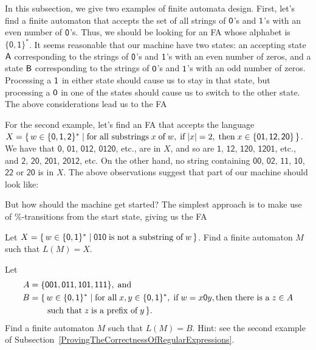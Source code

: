 %
In this subsection, we give two examples of finite automata
design.  First, let's find a finite automaton that accepts the set
of all strings of $\mathsf{0}$'s and $\mathsf{1}$'s with an even number of
$\mathsf{0}$'s.  Thus, we should be looking for an FA whose alphabet is
$\{\mathsf{0,1}\}^*$.  It seems reasonable that our machine have two
states: an accepting state $\mathsf{A}$ corresponding to the strings of
$\mathsf{0}$'s and $\mathsf{1}$'s with an even number of zeros, and a state
$\mathsf{B}$ corresponding to the strings of $\mathsf{0}$'s and $\mathsf{1}$'s with
an odd number of zeros.  Processing a $\mathsf{1}$ in either state should
cause us to stay in that state, but processing a $\mathsf{0}$ in one of
the states should cause us to switch to the other state.  The above
considerations lead us to the FA
\begin{center}

\end{center}

For the second example, let's find an FA that accepts the language
$X=\{ \, w\in\mathsf{\{0,1,2\}^*} \mid \allowbreak\mbox{for all substrings}\allowbreak\;x
  \;\allowbreak\mbox{of}\allowbreak\;w,\;\allowbreak\mbox{if}\allowbreak\;|x|=2,\;\allowbreak\mbox{then}\allowbreak\;x\in\{\mathsf{01,12,20}\} \, \}$.
We have that $\mathsf{0}$, $\mathsf{01}$, $\mathsf{012}$,
$\mathsf{0120}$, etc., are in $X$, and so are $\mathsf{1}$,
$\mathsf{12}$, $\mathsf{120}$, $\mathsf{1201}$, etc., and
$\mathsf{2}$, $\mathsf{20}$, $\mathsf{201}$, $\mathsf{2012}$, etc.  On
the other hand, no string containing $\mathsf{00}$, $\mathsf{02}$,
$\mathsf{11}$, $\mathsf{10}$, $\mathsf{22}$ or $\mathsf{20}$ is in
$X$.  The above observations suggest that part of our machine should
look like:
\begin{center}

\end{center}
But how should the machine get started?  The simplest approach is to
make use of $\%$-transitions from the start state, giving us
the FA
\begin{center}

\end{center}

\begin{exercise}
Let $X=\{ \, w\in\{\mathsf{0,1}\}^* \mid \mathsf{010}\;\allowbreak\mbox{is not a
    substring of}\allowbreak\;w \, \}$.  Find a finite automaton $M$ such that $L(M)=X$.
\end{exercise}

\begin{exercise}
Let
\begin{align*}
A &=\{\mathsf{001, 011, 101, 111}\} , \;\allowbreak\mbox{and}\allowbreak\; \\
B &=\{\,w\in\{\mathsf{0,1}\}^* \mid \allowbreak\mbox{for all}\allowbreak\;x,y\in\{\mathsf{0,1}\}^*,
\;\allowbreak\mbox{if}\allowbreak\;w=x\mathsf{0} y, \allowbreak\mbox{then there is a}\allowbreak\; z\in A \\
&\quad\;\;\; \;\allowbreak\mbox{such that}\allowbreak\; z\;\allowbreak\mbox{is a prefix of}\allowbreak\; y\,\}.
\end{align*}
Find a finite automaton $M$ such that $L(M)=B$.  Hint: see the second
example of Subsection~\ref{ProvingTheCorrectnessOfRegularExpressions}.
\end{exercise}

